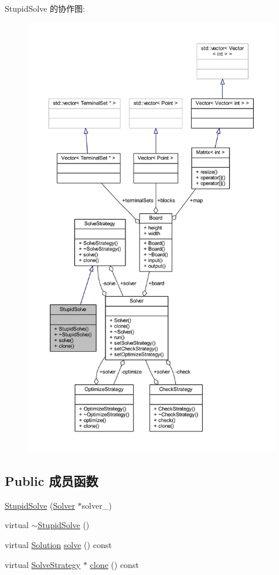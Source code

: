 Stupid\+Solve 的协作图\+:
\nopagebreak
\begin{figure}[H]
\begin{center}
\leavevmode
\includegraphics[height=550pt]{classStupidSolve__coll__graph}
\end{center}
\end{figure}
\subsection*{Public 成员函数}
\begin{DoxyCompactItemize}
\item 
\hyperlink{classStupidSolve_a6362d046b2b7082d7fbd7251e991f99f}{Stupid\+Solve} (\hyperlink{classSolver}{Solver} $\ast$solver\+\_\+)
\item 
virtual \hyperlink{classStupidSolve_a5492220840d035dfae95335957eb1848}{$\sim$\+Stupid\+Solve} ()
\item 
virtual \hyperlink{classSolution}{Solution} \hyperlink{classStupidSolve_aee240779acb1983c0fba3dfc6bec643f}{solve} () const 
\item 
virtual \hyperlink{classSolveStrategy}{Solve\+Strategy} $\ast$ \hyperlink{classStupidSolve_aeec5309af1a0358ac13ff5f9384e3af7}{clone} () const 
\end{DoxyCompactItemize}
